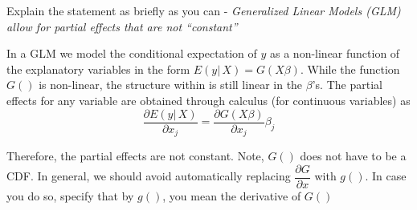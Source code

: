 
\question[2] Explain the statement as briefly as you can - 
\textit{Generalized Linear Models (GLM) allow for partial effects that are not ``constant''}

\begin{solution}[\halfpage]
  In a GLM we model the conditional expectation of $y$ as a non-linear function of the explanatory 
  variables in the form $E(y\vert\,X) = G(X\beta)$. While the function $G()$ is non-linear, the structure 
  within is still linear in the $\beta$'s. The partial effects for any variable are obtained through 
  calculus (for continuous variables) as 
    \[\frac{\partial E(y\vert\,X)}{\partial x_{j}} = \frac{\partial G(X\beta)}{\partial x_{j}} \beta_{j}\]

  Therefore, the partial effects are not constant. Note, $G()$ does not have to be a CDF. In general, 
  we should avoid automatically replacing $\dfrac{\partial G}{\partial x}$ with $g()$. In case you do so, 
  specify that by $g()$, you mean the derivative of $G()$
\end{solution}

